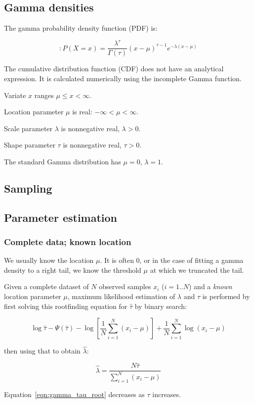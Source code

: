 
\subsection{Gamma densities}

The gamma probability density function (PDF) is:

\begin{equation}:
P(X=x) =  \frac{\lambda^{\tau}}{\Gamma(\tau)}  (x-\mu)^{\tau-1}  e^{-
  \lambda (x - \mu)}
\label{eqn:gamma_pdf}
\end{equation}

The cumulative distribution function (CDF) does not have an analytical
expression. It is calculated numerically using the incomplete Gamma
function.

Variate $x$ ranges $\mu \leq x < \infty$.

Location parameter $\mu$ is real: $-\infty < \mu < \infty$.

Scale parameter $\lambda$ is nonnegative real, $\lambda > 0$.

Shape parameter $\tau$ is nonnegative real, $\tau > 0$.

The standard Gamma distribution has $\mu = 0$, $\lambda = 1$.


\subsection{Sampling}



\subsection{Parameter estimation}

\subsubsection{Complete data; known location}

We usually know the location $\mu$. It is often 0, or in the case of
fitting a gamma density to a right tail, we know the threshold $\mu$
at which we truncated the tail.

Given a complete dataset of $N$ observed samples $x_i$ ($i=1..N$) and
a \emph{known} location parameter $\mu$, maximum likelihood estimation
of $\lambda$ and $\tau$ is performed by first solving this rootfinding
equation for $\hat{\tau}$ by binary search:

\begin{equation}
  \log \hat{\tau} 
  - \Psi(\hat{\tau}) 
  - \log \left[ \frac{1}{N} \sum_{i=1}^{N} (x_i - \mu) \right]
  + \frac{1}{N} \sum_{i=1}^N \log (x_i - \mu)
\label{eqn:gamma_tau_root}
\end{equation}

then using that to obtain $\hat{\lambda}$:

\begin{equation}
\hat{\lambda} = \frac{N \hat{\tau}} {\sum_{i=1}^{N} (x_i - \mu)}
\end{equation}

Equation~\ref{eqn:gamma_tau_root} decreases as $\tau$ increases.
